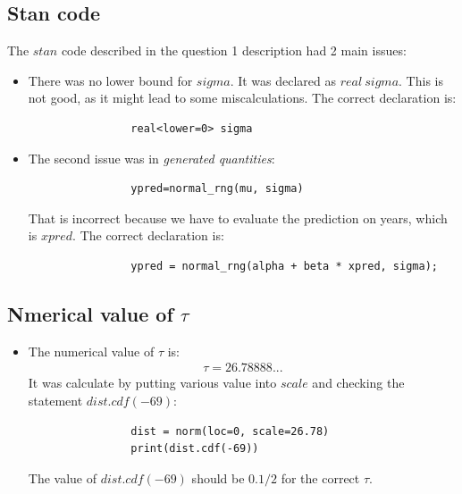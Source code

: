 \documentclass[11pt,a4paper,english]{article}
\begin{document}
        \subsection{Stan code}
          The $stan$ code described in the question 1 description had 2 main issues:
          \begin{itemize}
            \item
              There was no lower bound for $sigma$. It was declared as $real \ sigma$. This is not good, as it might lead to some miscalculations. The correct declaration is:
              \begin{verbatim}
                real<lower=0> sigma
              \end{verbatim}
            \item
              The second issue was in \textit{generated quantities}:
              \begin{verbatim}
                ypred=normal_rng(mu, sigma)
              \end{verbatim}
              That is incorrect because we have to evaluate the prediction on years, which is $xpred$. The correct declaration is:
              \begin{verbatim}
                ypred = normal_rng(alpha + beta * xpred, sigma);
              \end{verbatim}
          \end{itemize}

        \subsection{Nmerical value of $\tau$}
          \begin{itemize}
            \item The numerical value of $\tau$ is:
              \begin{align*}
                \tau=26.78888...
              \end{align*}
              It was calculate by putting various value into $scale$ and checking the statement $dist.cdf(-69)$:
              \begin{verbatim}
                dist = norm(loc=0, scale=26.78)
                print(dist.cdf(-69))
              \end{verbatim}
              The value of $dist.cdf(-69)$ should be $0.1/2$ for the correct $\tau$.
          \end{itemize}
\end{document}
